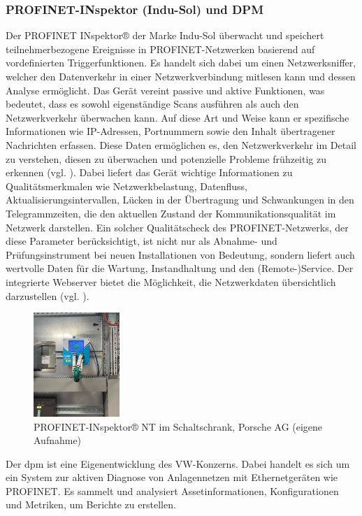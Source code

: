 \subsubsection{PROFINET-INspektor (Indu-Sol) und DPM}

 Der PROFINET INspektor® der Marke Indu-Sol überwacht und speichert teilnehmerbezogene Ereignisse in PROFINET-Netzwerken basierend auf vordefinierten Triggerfunktionen. Es handelt sich dabei um einen Netzwerksniffer, welcher den Datenverkehr in einer Netzwerkverbindung mitlesen kann und dessen Analyse ermöglicht. Das Gerät vereint passive und aktive Funktionen, was bedeutet, dass es sowohl eigenständige Scans ausführen als auch den Netzwerkverkehr überwachen kann. Auf diese Art und Weise kann er spezifische Informationen wie IP-Adressen, Portnummern sowie den Inhalt übertragener Nachrichten erfassen. Diese Daten ermöglichen es, den Netzwerkverkehr im Detail zu verstehen, diesen zu überwachen und potenzielle Probleme frühzeitig zu erkennen (vgl. \cite{luber}). Dabei liefert das Gerät wichtige Informationen zu Qualitätsmerkmalen wie Netzwerkbelastung, Datenfluss, Aktualisierungsintervallen, Lücken in der Übertragung und Schwankungen in den Telegrammzeiten, die den aktuellen Zustand der Kommunikationsqualität im Netzwerk darstellen. Ein solcher Qualitätscheck des PROFINET-Netzwerks, der diese Parameter berücksichtigt, ist nicht nur als Abnahme- und Prüfungsinstrument bei neuen Installationen von Bedeutung, sondern liefert auch wertvolle Daten für die Wartung, Instandhaltung und den (Remote-)Service. Der integrierte Webserver bietet die Möglichkeit, die Netzwerkdaten übersichtlich darzustellen (vgl. \cite{InduSol}).
\begin{figure}[H]
    \centering
    \includegraphics[width=0.29\textwidth]{images/PROFINET-INspektor.jpg}
    \caption{PROFINET-INspektor® NT im Schaltschrank, Porsche AG (eigene Aufnahme)}
    \label{fig:PROFINET-INspektor® NT}
\end{figure} 
\noindent Der \ac{dpm} ist eine Eigenentwicklung des VW-Konzerns. Dabei handelt es sich um ein System zur aktiven Diagnose von Anlagennetzen mit Ethernetgeräten wie PROFINET. Es sammelt und analysiert Assetinformationen, Konfigurationen und Metriken, um Berichte zu erstellen. 

